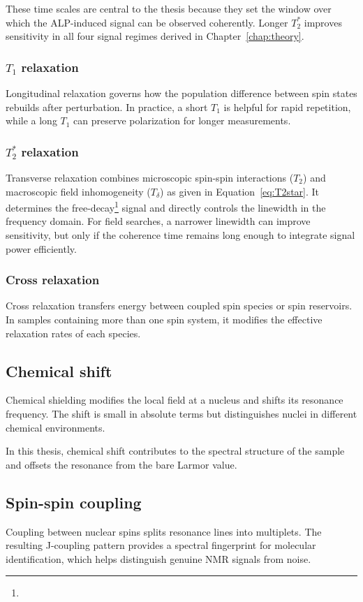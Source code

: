These time scales are central to the thesis because they set the window over which the ALP-induced signal can be observed coherently. Longer $T_2^*$ improves sensitivity in all four signal regimes derived in Chapter~\ref{chap:theory}.

\subsubsection{$T_1$ relaxation}\label{sec:NMR:Relax:T1}
Longitudinal relaxation governs how the population difference between spin states rebuilds after perturbation. In practice, a short $T_1$ is helpful for rapid repetition, while a long $T_1$ can preserve polarization for longer measurements.

\subsubsection{$T_2^*$ relaxation}\label{sec:NMR:Relax:T2}
Transverse relaxation combines microscopic spin-spin interactions ($T_2$) and macroscopic field inhomogeneity ($T_\delta$) as given in Equation~\eqref{eq:T2star}. It determines the free-decay\footnote{} signal and directly controls the linewidth in the frequency domain. For field searches, a narrower linewidth can improve sensitivity, but only if the coherence time remains long enough to integrate signal power efficiently.

\subsubsection{Cross relaxation}
Cross relaxation transfers energy between coupled spin species or spin reservoirs. In samples containing more than one spin system, it modifies the effective relaxation rates of each species.

\subsection{Chemical shift}
Chemical shielding modifies the local field at a nucleus and shifts its resonance frequency. The shift is small in absolute terms but distinguishes nuclei in different chemical environments.

In this thesis, chemical shift contributes to the spectral structure of the sample and offsets the resonance from the bare Larmor value.

\subsection{Spin-spin coupling}
Coupling between nuclear spins splits resonance lines into multiplets. The resulting J-coupling pattern provides a spectral fingerprint for molecular identification, which helps distinguish genuine NMR signals from noise.

